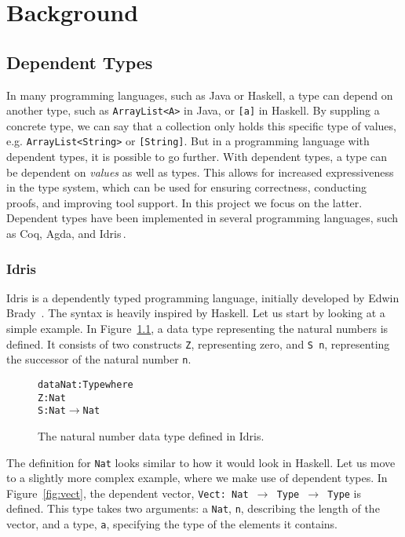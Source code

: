 \chapter{Background}

\section{Dependent Types}
\label{sec:DependentTypes}
In many programming languages, such as Java or Haskell, a type can depend on another type, such as \texttt{ArrayList<A>} in Java, or \texttt{[a]} in Haskell. By suppling a concrete type, we can say that a collection only holds this specific type of values, e.g. \texttt{ArrayList<String>} or \texttt{[String]}. But in a programming language with dependent types, it is possible to go further. With dependent types, a type can be dependent on \emph{values} as well as types. This allows for increased expressiveness in the type system, which can be used for ensuring correctness, conducting proofs, and improving tool support. In this project we focus on the latter. Dependent types have been implemented in several programming languages, such as Coq\cite{Coq}, Agda\cite{Agda}, and
Idris\,\cite{Idris}.

\subsection{Idris}
\label{subsec:Idris}
Idris is a dependently typed programming language, initially developed by Edwin Brady~\cite{Idris}. The syntax is heavily inspired by Haskell. Let us start by looking at a simple example. In Figure~\ref{fig:nat}, a data type representing the natural numbers is defined. It consists of two constructs \texttt{Z}, representing zero, and \texttt{S~n}, representing the successor of the natural number \texttt{n}.

\begin{figure}
\begin{alltt}
data Nat : Type where
  Z : Nat
  S : Nat \(\to\) Nat
\end{alltt}
\caption{The natural number data type defined in Idris.}
\label{fig:nat}
\end{figure}

The definition for \texttt{Nat} looks similar to how it would look in Haskell. Let us move to a slightly more complex example, where we make use of dependent types. In Figure~\ref{fig:vect}, the dependent vector, \texttt{Vect: Nat $\to$ Type $\to$ Type} is defined. This type takes two arguments: a \texttt{Nat}, \texttt{n}, describing the length of the vector, and a type, \texttt{a}, specifying the type of the elements it contains.

